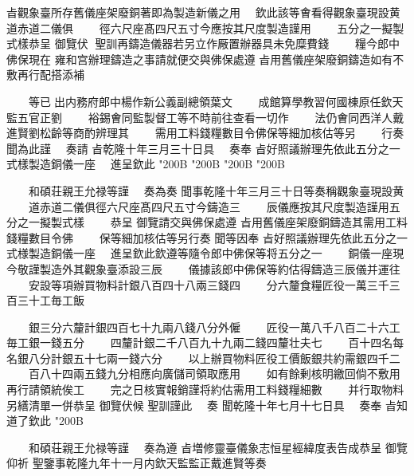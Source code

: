 \begin{正文}
㫖觀象臺所存舊儀座架廢銅著即為製造新儀之用
　欽此該等㑹看得觀象臺現設黄道赤道二儀俱
　　徑六尺座髙四尺五寸今應按其尺度製造謹用
　　五分之一擬製式樣恭呈
御覽伏𠉀
聖訓再鑄造儀器若另立作厰置辦器具未免糜費錢
　　糧今郎中佛保現在
雍和宫辦理鑄造之事請就便交與佛保處遵
㫖用舊儀座架廢銅鑄造如有不敷再行配搭添補
\par
　　等已𣲖出内務府郎中楊作新公義副總領葉文
　　成館算學教習何國棟原任欽天監五官正劉
　　裕錫㑹同監製督工等不時前往查看一切作
　　法仍㑹同西洋人戴進賢劉松齡等商酌辨理其
　　需用工料錢糧數目令佛保等細加核估等另
　　行奏
聞為此謹
　奏請
㫖乾隆十年三月三十日具
　奏奉
㫖好照議辦理先依此五分之一式樣製造銅儀一座
　進呈欽此
\char"200B\relax{}
\char"200B\relax{}
\char"200B\relax{}
\char"200B\relax
\par
　　和碩荘親王允禄等謹
　奏為奏
聞事乾隆十年三月三十日等奏稱觀象臺現設黄
　　道赤道二儀俱徑六尺座髙四尺五寸今鑄造三
　　辰儀應按其尺度製造謹用五分之一擬製式樣
　　恭呈
御覽請交與佛保處遵
㫖用舊儀座架廢銅鑄造其需用工料錢糧數目令佛
　　保等細加核估等另行奏
聞等因奉
㫖好照議辦理先依此五分之一式様製造銅儀一座
　進呈欽此欽遵等隨令郎中佛保等将五分之一
　　銅儀一座現今敬謹製造外其觀象臺添設三辰
　　儀據該郎中佛保等約估得鑄造三辰儀并運往
　　安設等項辦買物料計銀八百四十八兩三錢四
　　分六釐食糧匠役一萬三千三百三十工毎工飯
\par
　　銀三分六釐計銀四百七十九兩八錢八分外僱
　　匠役一萬八千八百二十六工毎工銀一錢五分
　　四釐計銀二千八百九十九兩二錢四釐壮夫七
　　百十四名每名銀八分計銀五十七兩一錢六分
　　以上辦買物料匠役工價飯銀共約需銀四千二
　　百八十四兩五錢九分相應向廣儲司領取應用
　　如有餘剰核明繳回倘不敷用再行請領統俟工
　　完之日核實報銷謹将約估需用工料錢糧細數
　　并行取物料另繕清單一併恭呈
御覽伏候
聖訓謹此
　奏
聞乾隆十年七月十七日具
　奏奉
㫖知道了欽此
\char"200B\relax
\par
　　和碩荘親王允禄等謹
　奏為遵
㫖増修靈臺儀象志恒星經緯度表告成恭呈
御覽仰祈
聖鑒事乾隆九年十一月内欽天監監正戴進賢等奏

\end{正文}
